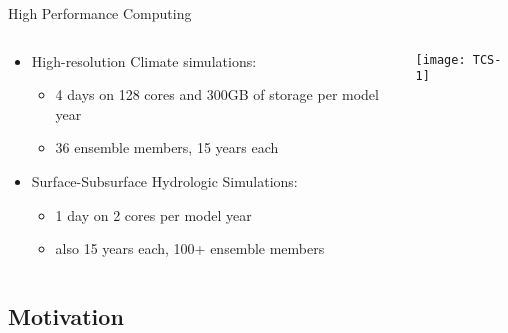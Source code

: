 \documentclass[hyperref={pdfpagelabels=false},compress,final]{beamer}
\newenvironment{myBox}[3][shadow=true]%
{\begin{center} \begin{minipage}{#2} \begin{beamerboxesrounded}[#1]{#3} \smallskip}%
      {\smallskip \end{beamerboxesrounded} \end{minipage} \end{center}}
\begin{document}
\begin{frame}{High Performance Computing}
  \begin{columns}[T]
 \begin{column}{0.5\textwidth}
  \begin{itemize}
  \item High-resolution Climate simulations:\\ \smallskip
    \begin{itemize}
     \item 4 days on 128 cores and 300GB of storage per model year
     \item 36 ensemble members, 15 years each
    \end{itemize}
  \medskip %
  \item Surface-Subsurface Hydrologic Simulations:\\ \smallskip
    \begin{itemize}
     \item 1 day on 2 cores per model year
     \item also 15 years each, 100+ ensemble members
    \end{itemize}
  \end{itemize}
 \end{column}
 \begin{column}{0.5\textwidth}
   \vspace*{-.8cm}
  \texttt{[image: TCS-1]}
 \end{column}
\end{columns}
\end{frame}


\subsection*{Motivation}
\end{document}
